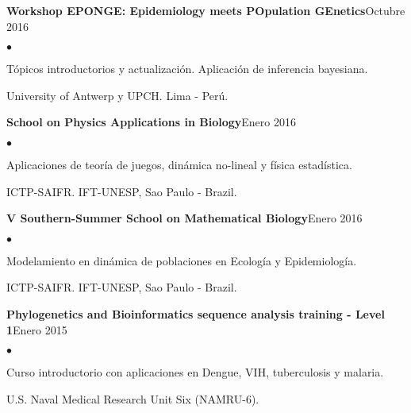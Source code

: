 \documentclass[margin,line]{res}
\newenvironment{list2}{
	\begin{list}{$\bullet$}{%
			\setlength{\itemsep}{0in}
			\setlength{\parsep}{0in} \setlength{\parskip}{0in}
			\setlength{\topsep}{0in} \setlength{\partopsep}{0in}
			\setlength{\leftmargin}{0.2in}}}{\end{list}}
\begin{document}
\begin{resume}
		{\bf Workshop EPONGE: Epidemiology meets POpulation GEnetics}\hfill {Octubre 2016}\\
		\vspace*{-.1in}
		\begin{list2} %
			\item Tópicos introductorios y actualización. Aplicación de inferencia bayesiana.
			\item University of Antwerp y UPCH. Lima - Perú.
		\end{list2}

		{\bf School on Physics Applications in Biology}\hfill {Enero 2016}\\
		\vspace*{-.1in}%
		\begin{list2} %
			\item Aplicaciones de teoría de juegos, dinámica no-lineal y física estadística.
			\item ICTP-SAIFR. IFT-UNESP, Sao Paulo - Brazil. %
		\end{list2}
		
		{\bf V Southern-Summer School on Mathematical Biology}\hfill {Enero 2016}\\
		\vspace*{-.1in}%
		\begin{list2} %
			\item Modelamiento en dinámica de poblaciones en Ecología y Epidemiología.
			\item ICTP-SAIFR. IFT-UNESP, Sao Paulo - Brazil.
		\end{list2}
		
		{\bf Phylogenetics and Bioinformatics sequence analysis training - Level 1}\hfill {Enero 2015}\\
		\vspace*{-.1in}
		\begin{list2} %
			\item Curso introductorio con aplicaciones en Dengue, VIH, tuberculosis y malaria.
			\item U.S. Naval Medical Research Unit Six (NAMRU-6).%
		\end{list2}
		

\end{resume}
\end{document}
